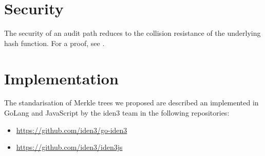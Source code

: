 \documentclass[11pt]{article}
\begin{document}




\section{Security}					%
\label{sec-security}
The  security  of  an  audit  path  reduces  to  the  collision  resistance  of the underlying hash function. For a proof, see \cite[Lemma 1]{security-mt}. 

%
%
%
%
%
%
%


\section{Implementation}			%
The standarisation of Merkle trees we proposed are described an implemented in GoLang and JavaScript by the iden3 team in the following repositories:
\begin{itemize}
	\item \url{https://github.com/iden3/go-iden3}
	\item \url{https://github.com/iden3/iden3js}
\end{itemize}
\end{document}
